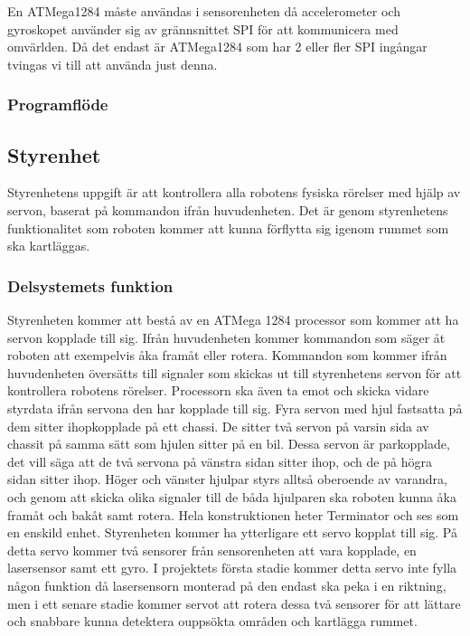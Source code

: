 \documentclass{article}
\begin{document}
En ATMega1284 måste användas i sensorenheten då accelerometer och gyroskopet använder sig av grännsnittet SPI för att kommunicera med omvärlden. Då det endast är ATMega1284 som har 2 eller fler SPI ingångar tvingas vi till att använda just denna.

\subsubsection{Programflöde}

\clearpage

\subsection{Styrenhet}
Styrenhetens uppgift är att kontrollera alla robotens fysiska rörelser med hjälp av servon, baserat på kommandon ifrån huvudenheten. Det är genom styrenhetens funktionalitet  som roboten kommer att kunna förflytta sig igenom rummet som ska kartläggas.
 
\subsubsection{Delsystemets funktion}
Styrenheten kommer att bestå av en ATMega 1284 processor som kommer att ha servon kopplade till sig. Ifrån huvudenheten kommer kommandon som säger åt roboten att exempelvis åka framåt eller rotera. Kommandon som kommer ifrån huvudenheten översätts till signaler som skickas ut till styrenhetens servon för att kontrollera robotens rörelser. Processorn ska även ta emot och skicka vidare styrdata ifrån servona den har kopplade till sig.
\newline\newline
Fyra servon med hjul fastsatta på dem sitter ihopkopplade på ett chassi. De sitter två servon på varsin sida av chassit på samma sätt som hjulen sitter på en bil. Dessa servon är parkopplade, det vill säga att de två servona på vänstra sidan sitter ihop, och de på högra sidan sitter ihop. Höger och vänster hjulpar styrs alltså oberoende av varandra, och genom att skicka olika signaler till de båda hjulparen ska roboten kunna åka framåt och bakåt samt rotera. Hela konstruktionen heter Terminator och ses som en enskild enhet.
\newline\newline
Styrenheten kommer ha ytterligare ett servo kopplat till sig. På detta servo kommer två sensorer från sensorenheten att vara kopplade, en lasersensor samt ett gyro. I projektets första stadie kommer detta servo inte fylla någon funktion då lasersensorn monterad på den endast ska peka i en riktning, men i ett senare stadie kommer servot att rotera dessa två sensorer för att lättare och snabbare kunna detektera ouppsökta områden och kartlägga rummet.
\end{document}
